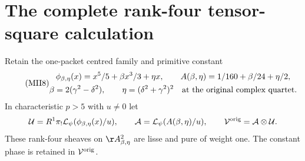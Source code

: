 \documentclass[11pt,a4paper]{article}
\begin{document}
\section{The complete rank-four tensor-square calculation}
Retain the one-packet centred family and primitive constant
\begin{equation}\tag{MII8}\label{mii:mii:quintic}
 \begin{gathered}
 \phi_{\beta,\eta}(x)=x^5/5+\beta x^3/3+\eta x,\qquad
 A(\beta,\eta)=1/160+\beta/24+\eta/2,\\
 \beta=2(\gamma^2-\delta^2),\qquad
 \eta=(\delta^2+\gamma^2)^2
 \quad\hbox{at the original complex quartet}.
 \end{gathered}
\end{equation}
In characteristic $p>5$ with $u\ne0$ let
\[
 \mathcal U=R^1\pi_!\mathcal L_\psi(\phi_{\beta,\eta}(x)/u),\qquad
 \mathcal A=\mathcal L_\psi(A(\beta,\eta)/u),\qquad
 \mathcal V^{\rm orig}=\mathcal A\otimes\mathcal U.
\]
These rank-four sheaves on $\AA^2_{\beta,\eta}$ are lisse and pure of
weight one. The constant phase is retained in $\mathcal V^{\rm orig}$.
\end{document}
